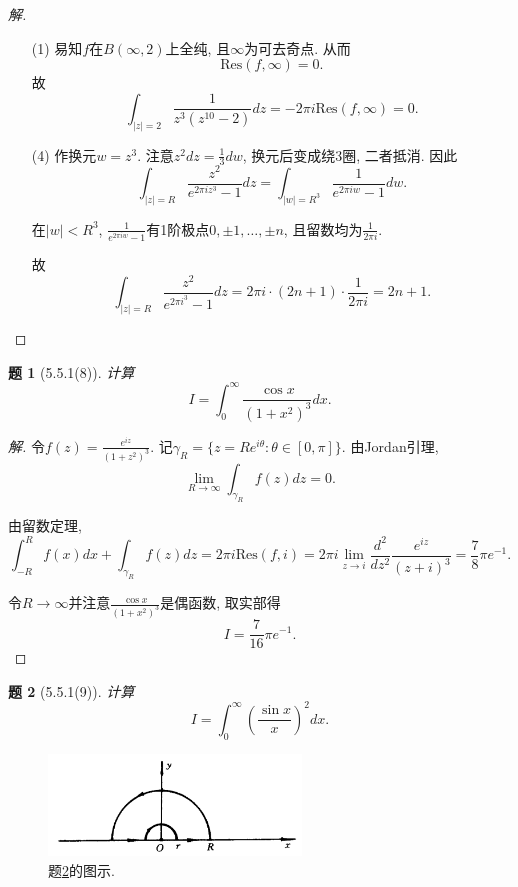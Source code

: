 \documentclass{article}[a4paper, 12pt]
\theoremstyle{mystyle}
\newtheorem{problem}{题}
\newenvironment{solution}{\begin{proof}[解]}{\end{proof}}
\begin{document}
\begin{solution}
  \begin{itemize}
    \item [(1)] 易知\(f\)在\(B(\infty,2)\)上全纯, 且\(\infty\)为可去奇点. 从而\[\text{Res}(f,\infty)=0.\] 故\[\int_{|z|=2}\frac{1}{z^3(z^{10}-2)}dz=-2\pi i\text{Res}(f,\infty)=0.\]
    \item [(4)] 作换元\(w=z^3\). 注意\(z^2dz=\frac13dw\), 换元后变成绕3圈, 二者抵消. 因此\[\int_{|z|=R}\frac{z^2}{e^{2\pi i z^3}-1}dz = \int_{|w|=R^3}\frac{1}{e^{2\pi i w}-1}dw.\]
    
    在\(|w|<R^3\), \(\frac{1}{e^{2\pi i w}-1}\)有1阶极点\(0,\pm1,\dots,\pm n\), 且留数均为\(\frac{1}{2\pi i}\).

    故\[\int_{|z|=R}\frac{z^2}{e^{2\pi i ^3}-1}dz=2\pi i\cdot(2n+1)\cdot\frac{1}{2\pi i}=2n+1. \tag*{\(\qed\)}\]
  \end{itemize}
  \renewcommand{\qedsymbol}{}
\end{solution}

\begin{problem}[5.5.1(8)]
  计算\[I=\int_0^\infty \frac{\cos x}{(1+x^2)^3}dx.\]
\end{problem}

\begin{solution}
  令\(f(z)=\frac{e^{iz}}{(1+z^2)^3}\). 记\(\gamma_R=\{z=Re^{i\theta}:\theta\in[0,\pi]\}\). 由Jordan引理, \[\lim_{R\to\infty}\int_{\gamma_R}f(z)dz=0.\]

  由留数定理, \[\int_{-R}^R f(x)dx+\int_{\gamma_R}f(z)dz=2\pi i\text{Res}(f, i)=2\pi i\lim_{z\to i}\frac{d^2}{dz^2}\frac{e^{iz}}{(z+i)^3}=\frac{7}{8}\pi e^{-1}.\]

  令\(R\to \infty\)并注意\(\frac{\cos x}{(1+x^2)^3}\)是偶函数, 取实部得\[I=\frac{7}{16}\pi e^{-1}.\tag*{\(\qed\)}\]
  \renewcommand{\qedsymbol}{}
\end{solution}

\begin{problem}[5.5.1(9)] \label{9}
  计算\[I=\int_0^\infty \left(\frac{\sin x}{x}\right)^2dx.\]
\end{problem}

\begin{figure}[htbp]
  \centering
  \includegraphics[width=0.6\textwidth]{images/9.png}
  \caption{题\ref{9}的图示.}
  \label{fig:9}
\end{figure}
\end{document}
